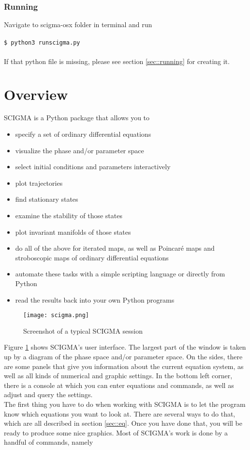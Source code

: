 \documentclass[10pt,a4paper,titlepage]{article}
\newcommand{\T}[1]{\texttt{#1}}
\newcommand{\C}[1]{\\\\\T{#1}\\\\}
\begin{document}
\subsubsection{Running}
Navigate to scigma-osx folder in terminal and run 
\C{\$ python3 runscigma.py}
If that python file is missing, please see section \ref{sec::running} for creating it.

\newpage\section{Overview}
SCIGMA is a Python package that allows you to
\begin{itemize}
\item{specify a set of ordinary differential equations}
\item{visualize the phase and/or parameter space}
\item{select initial conditions and parameters interactively}
\item{plot trajectories}
\item{find stationary states}
\item{examine the stability of those states}
\item{plot invariant manifolds of those states}
\item{do all of the above for iterated maps, as well as
  Poincar\'e maps and stroboscopic maps of ordinary
  differential equations}
\item{automate these tasks with a simple scripting language
  or directly from Python}
\item{read the results back into your own Python programs}
\end{itemize}
\begin{figure}
\texttt{[image: scigma.png]}
\caption{Screenshot of a typical SCIGMA session}
\label{fig::screen}
\end{figure}
Figure \ref{fig::screen} shows SCIGMA's user interface. The largest part of the window is taken up by a diagram of the phase space and/or parameter space. On the sides, there are some panels that give you information about the current equation system, as well as all kinds of numerical and graphic settings. In the bottom left corner, there is a console at which you can enter equations and commands, as well as adjust and query the settings.\\
The first thing you have to do when working with SCIGMA is to let the program know which equations you want to look at. There are several ways to do that, which are all described in section \ref{sec::eq}. Once you have done that, you will be ready to produce some nice graphics. Most of SCIGMA's work is done by a handful of commands, namely
\end{document}
